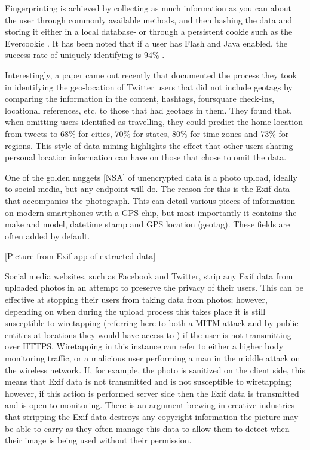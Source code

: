 Fingerprinting is achieved by collecting as much information as you can about the user through commonly available methods, and then hashing the data and storing it either in a local database- or through a persistent cookie such as the Evercookie \cite{intro:evercookie}. It has been noted that if a user has Flash and Java enabled, the success rate of uniquely identifying is 94\% \cite{intro:unique_browser}. 

Interestingly, a paper \cite{intro:twitter_home_location} came out recently that documented the process they took in identifying the geo-location of Twitter users that did not include geotags by comparing the information in the content, hashtags, foursquare check-ins, locational references, etc. to those that had geotags in them. They found that, when omitting users identified as travelling, they could predict the home location from tweets to 68\% for cities, 70\% for states, 80\% for time-zones and 73\% for regions. This style of data mining highlights the effect that other users sharing personal location information can have on those that chose to omit the data. 

One of the golden nuggets [NSA] of unencrypted data is a photo upload, ideally to social media, but any endpoint will do. The reason for this is the Exif data that accompanies the photograph. This can detail various pieces of information on modern smartphones with a GPS chip, but most importantly it contains the make and model, datetime stamp and GPS location (geotag). These fields are often added by default. 

[Picture from Exif app of extracted data]

Social media websites, such as Facebook and Twitter, strip any Exif data from uploaded photos in an attempt to preserve the privacy of their users. This can be effective at stopping their users from taking data from photos; however, depending on when during the upload process this takes place it is still susceptible to wiretapping (referring here to both a MITM attack and by public entities at locations they would have access to \cite{intro:room_641a}) if the user is not transmitting over HTTPS. Wiretapping in this instance can refer to either a higher body monitoring traffic, or a malicious user performing a man in the middle attack on the wireless network. If, for example, the photo is sanitized on the client side, this means that Exif data is not transmitted and is not susceptible to wiretapping; however, if this action is performed server side then the Exif data is transmitted and is open to monitoring. There is an argument brewing in creative industries that stripping the Exif data destroys any copyright information the picture may be able to carry as they often manage this data to allow them to detect when their image is being used without their permission.

